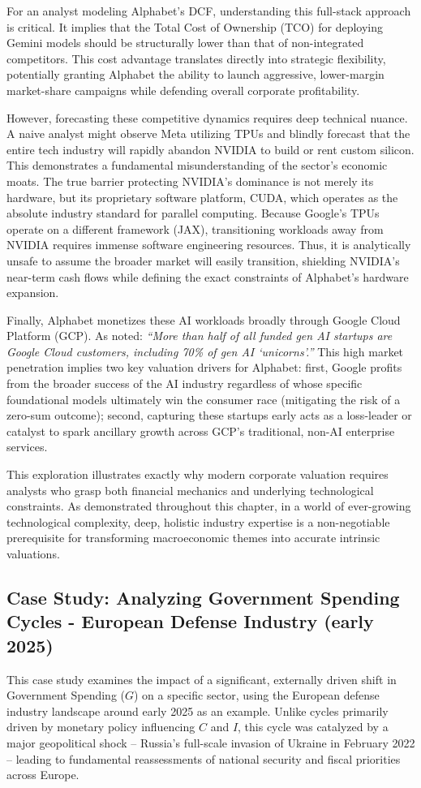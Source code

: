 For an analyst modeling Alphabet's DCF, understanding this full-stack approach is critical. It implies that the Total Cost of Ownership (TCO) for deploying Gemini models should be structurally lower than that of non-integrated competitors. This cost advantage translates directly into strategic flexibility, potentially granting Alphabet the ability to launch aggressive, lower-margin market-share campaigns while defending overall corporate profitability.

However, forecasting these competitive dynamics requires deep technical nuance. A naive analyst might observe Meta utilizing TPUs and blindly forecast that the entire tech industry will rapidly abandon NVIDIA to build or rent custom silicon. This demonstrates a fundamental misunderstanding of the sector's economic moats. The true barrier protecting NVIDIA's dominance is not merely its hardware, but its proprietary software platform, CUDA, which operates as the absolute industry standard for parallel computing. Because Google's TPUs operate on a different framework (JAX), transitioning workloads away from NVIDIA requires immense software engineering resources. Thus, it is analytically unsafe to assume the broader market will easily transition, shielding NVIDIA's near-term cash flows while defining the exact constraints of Alphabet's hardware expansion.

Finally, Alphabet monetizes these AI workloads broadly through Google Cloud Platform (GCP). As \textcite{james2023leading} noted: \textit{``More than half of all funded gen AI startups are Google Cloud customers, including 70\% of gen AI `unicorns'.''} This high market penetration implies two key valuation drivers for Alphabet: first, Google profits from the broader success of the AI industry regardless of whose specific foundational models ultimately win the consumer race (mitigating the risk of a zero-sum outcome); second, capturing these startups early acts as a loss-leader or catalyst to spark ancillary growth across GCP's traditional, non-AI enterprise services.

This exploration illustrates exactly why modern corporate valuation requires analysts who grasp both financial mechanics and underlying technological constraints. As demonstrated throughout this chapter, in a world of ever-growing technological complexity, deep, holistic industry expertise is a non-negotiable prerequisite for transforming macroeconomic themes into accurate intrinsic valuations.

\subsection{Case Study: Analyzing Government Spending Cycles - European Defense Industry (early 2025)} \label{subsec:case_study_defense}
This case study examines the impact of a significant, externally driven shift in Government Spending (\(G\)) on a specific sector, using the European defense industry landscape around early 2025 as an example. Unlike cycles primarily driven by monetary policy influencing \(C\) and \(I\), this cycle was catalyzed by a major geopolitical shock – Russia's full-scale invasion of Ukraine in February 2022 – leading to fundamental reassessments of national security and fiscal priorities across Europe.

